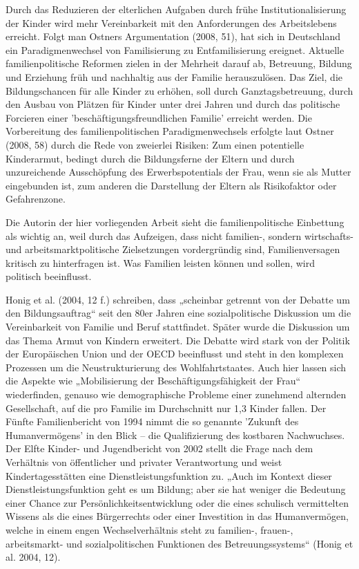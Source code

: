Durch das Reduzieren der elterlichen Aufgaben durch frühe Institutionalisierung der Kinder wird mehr Vereinbarkeit mit den Anforderungen des Arbeitslebens erreicht. Folgt man Ostners Argumentation (2008, 51), hat sich in Deutschland ein Paradigmenwechsel von Familisierung zu Entfamilisierung ereignet. Aktuelle familienpolitische Reformen zielen in der Mehrheit darauf ab, Betreuung, Bildung und Erziehung früh und nachhaltig aus der Familie herauszulösen. Das Ziel, die Bildungschancen für alle Kinder zu erhöhen, soll durch Ganztagsbetreuung, durch den Ausbau von Plätzen für Kinder unter drei Jahren und durch das politische Forcieren einer 'beschäftigungsfreundlichen Familie' erreicht werden. Die Vorbereitung des familienpolitischen Paradigmenwechsels erfolgte laut Ostner (2008, 58) durch die Rede von zweierlei Risiken: Zum einen potentielle Kinderarmut, bedingt durch die Bildungsferne der Eltern und durch unzureichende Ausschöpfung des Erwerbspotentials der Frau, wenn sie als Mutter eingebunden ist, zum anderen die Darstellung der Eltern als Risikofaktor oder Gefahrenzone.  

Die Autorin der hier vorliegenden Arbeit sieht die familienpolitische Einbettung als wichtig an, weil durch das Aufzeigen, dass nicht familien-, sondern wirtschafts- und arbeitsmarktpolitische Zielsetzungen vordergründig sind, Familienversagen kritisch zu hinterfragen ist. Was Familien leisten können und sollen, wird politisch beeinflusst.
 
Honig et al. (2004, 12 f.) schreiben, dass „scheinbar getrennt von der Debatte um den Bildungsauftrag“ seit den 80er Jahren eine sozialpolitische Diskussion um die Vereinbarkeit von Familie und Beruf stattfindet. Später wurde die Diskussion um das Thema Armut von Kindern erweitert. Die Debatte wird stark von der Politik der Europäischen Union und der OECD beeinflusst und steht in den komplexen Prozessen um die Neustrukturierung des Wohlfahrtstaates. Auch hier lassen sich die Aspekte wie „Mobilisierung der Beschäftigungsfähigkeit der Frau“ wiederfinden, genauso wie demographische Probleme einer zunehmend alternden Gesellschaft, auf die pro Familie im Durchschnitt nur 1,3 Kinder fallen. Der Fünfte Familienbericht von 1994 nimmt die so genannte 'Zukunft des Humanvermögens' in den Blick -- die Qualifizierung des kostbaren Nachwuchses. Der Elfte Kinder- und Jugendbericht von 2002 stellt die Frage nach dem Verhältnis von öffentlicher und privater Verantwortung und weist Kindertagesstätten eine Dienstleistungsfunktion zu. „Auch im Kontext dieser Dienstleistungsfunktion geht es um Bildung; aber sie hat weniger die Bedeutung einer Chance zur Persönlichkeitsentwicklung oder die eines schulisch vermittelten Wissens als die eines Bürgerrechts oder einer Investition in das Humanvermögen, welche in einem engen Wechselverhältnis steht zu familien-, frauen-, arbeitsmarkt- und sozialpolitischen Funktionen des Betreuungssystems“ (Honig et al. 2004, 12).  
 

